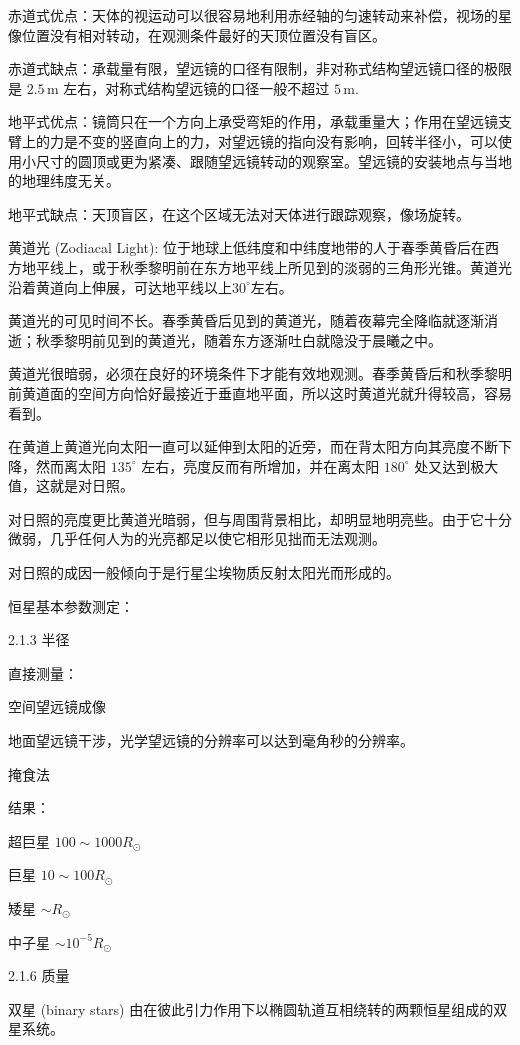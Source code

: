 \documentclass[11pt, a4paper, oneside, onecolumn]{ctexart}
\numberwithin{equation}{subsection}
\begin{document}
赤道式优点：天体的视运动可以很容易地利用赤经轴的匀速转动来补偿，视场的星像位置没有相对转动，在观测条件最好的天顶位置没有盲区。

赤道式缺点：承载量有限，望远镜的口径有限制，非对称式结构望远镜口径的极限是 $2.5\,\mathrm{m}$ 左右，对称式结构望远镜的口径一般不超过 $5\,\mathrm{m}$.

地平式优点：镜筒只在一个方向上承受弯矩的作用，承载重量大；作用在望远镜支臂上的力是不变的竖直向上的力，对望远镜的指向没有影响，回转半径小，可以使用小尺寸的圆顶或更为紧凑、跟随望远镜转动的观察室。望远镜的安装地点与当地的地理纬度无关。

地平式缺点：天顶盲区，在这个区域无法对天体进行跟踪观察，像场旋转。

黄道光 (Zodiacal Light): 位于地球上低纬度和中纬度地带的人于春季黄昏后在西方地平线上，或于秋季黎明前在东方地平线上所见到的淡弱的三角形光锥。黄道光沿着黄道向上伸展，可达地平线以上$30^{\circ}$左右。

黄道光的可见时间不长。春季黄昏后见到的黄道光，随着夜幕完全降临就逐渐消逝；秋季黎明前见到的黄道光，随着东方逐渐吐白就隐没于晨曦之中。

黄道光很暗弱，必须在良好的环境条件下才能有效地观测。春季黄昏后和秋季黎明前黄道面的空间方向恰好最接近于垂直地平面，所以这时黄道光就升得较高，容易看到。

在黄道上黄道光向太阳一直可以延伸到太阳的近旁，而在背太阳方向其亮度不断下降，然而离太阳 $135^{\circ}$ 左右，亮度反而有所增加，并在离太阳 $180^{\circ}$ 处又达到极大值，这就是对日照。

对日照的亮度更比黄道光暗弱，但与周围背景相比，却明显地明亮些。由于它十分微弱，几乎任何人为的光亮都足以使它相形见拙而无法观测。

对日照的成因一般倾向于是行星尘埃物质反射太阳光而形成的。

恒星基本参数测定：

2.1.3 半径

直接测量：

空间望远镜成像

地面望远镜干涉，光学望远镜的分辨率可以达到毫角秒的分辨率。

掩食法

结果：

超巨星 $100\sim1000R_\odot$

巨星	 $10\sim100R_\odot$

矮星	 $\sim R_\odot$

中子星 $\sim10^{-5}R_\odot$

2.1.6 质量

双星 (binary stars) 由在彼此引力作用下以椭圆轨道互相绕转的两颗恒星组成的双星系统。
\end{document}
